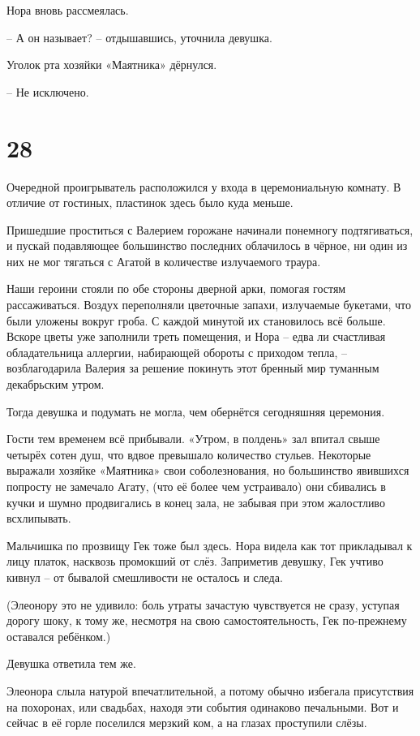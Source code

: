 \documentclass[
  a5paperpaper,
  DIV=11,
  numbers=noendperiod]{scrreprt}
\begin{document}
Нора вновь рассмеялась.

-- А он называет? -- отдышавшись, уточнила девушка.

Уголок рта хозяйки «Маятника» дёрнулся.

-- Не исключено.

\section*{28}\label{28}


Очередной проигрыватель расположился у входа в церемониальную комнату. В
отличие от гостиных, пластинок здесь было куда меньше.

Пришедшие проститься с Валерием горожане начинали понемногу
подтягиваться, и пускай подавляющее большинство последних облачилось в
чёрное, ни один из них не мог тягаться с Агатой в количестве излучаемого
траура.

Наши героини стояли по обе стороны дверной арки, помогая гостям
рассаживаться. Воздух переполняли цветочные запахи, излучаемые букетами,
что были уложены вокруг гроба. С каждой минутой их становилось всё
больше. Вскоре цветы уже заполнили треть помещения, и Нора -- едва ли
счастливая обладательница аллергии, набирающей обороты с приходом тепла,
-- возблагодарила Валерия за решение покинуть этот бренный мир туманным
декабрьским утром.

Тогда девушка и подумать не могла, чем обернётся сегодняшняя церемония.

Гости тем временем всё прибывали. «Утром, в полдень» зал впитал свыше
четырёх сотен душ, что вдвое превышало количество стульев. Некоторые
выражали хозяйке «Маятника» свои соболезнования, но большинство
явившихся попросту не замечало Агату, (что её более чем устраивало) они
сбивались в кучки и шумно продвигались в конец зала, не забывая при этом
жалостливо всхлипывать.

Мальчишка по прозвищу Гек тоже был здесь. Нора видела как тот
прикладывал к лицу платок, насквозь промокший от слёз. Заприметив
девушку, Гек учтиво кивнул -- от бывалой смешливости не осталось и
следа.

(Элеонору это не удивило: боль утраты зачастую чувствуется не сразу,
уступая дорогу шоку, к тому же, несмотря на свою самостоятельность, Гек
по-прежнему оставался ребёнком.)

Девушка ответила тем же.

Элеонора слыла натурой впечатлительной, а потому обычно избегала
присутствия на похоронах, или свадьбах, находя эти события одинаково
печальными. Вот и сейчас в её горле поселился мерзкий ком, а на глазах
проступили слёзы.
\end{document}
